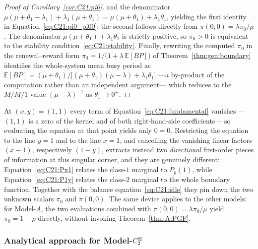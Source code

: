 \begin{proof}[Proof of Corollary~\ref{cor:C21:pi0}]
    and the denominator $\mu(\mu+\theta_1-\lambda_1)+\lambda_1(\mu+\theta_1)=\mu(\mu+\theta_1)+\lambda_1\theta_1$,
    yielding the first identity in Equation~\eqref{eq:C21:pi0_pi00}; the second follows directly from
    $\pi(0,0)=\lambda\pi_0/\mu$. The denominator $\mu(\mu+\theta_1)+\lambda_1\theta_1$ is strictly positive, so $\pi_0>0$ is equivalent to the stability condition~\eqref{eq:C21:stability}. Finally, rewriting the computed $\pi_0$ in the renewal--reward form $\pi_0=1/\bigl(1+\lambda\,\mathbb{E}[BP]\bigr)$ of Theorem~\ref{thm:gen:boundary} identifies the whole-system mean busy period as $\mathbb{E}[BP]=(\mu+\theta_1)/\bigl[(\mu+\theta_1)(\mu-\lambda)+\lambda_1\theta_1\bigr]$ ---a by-product of the computation rather than an independent argument--- which reduces to the $M/M/1$ value $(\mu-\lambda)^{-1}$ as $\theta_1\to0^+$.
\end{proof}

\begin{remark}\label{rem:C21:order}
At $(x,y)=(1,1)$ every term of Equation~\eqref{eq:C21:fundamental} vanishes ---$(1,1)$ is a zero of the kernel and of both right-hand-side coefficients--- so evaluating the equation at that point yields only $0=0$. Restricting the equation to the line $y=1$ and to the line $x=1$, and cancelling the vanishing linear factors $(x-1)$, respectively $(1-y)$, extracts instead two \emph{directional} first-order pieces of information at this singular corner, and they are genuinely different: Equation~\eqref{eq:C21:Px1} relates the class-$1$ marginal to $P_y(1)$, while Equation~\eqref{eq:C21:P1y} relates the class-$2$ marginal to the whole boundary function. Together with the balance equation~\eqref{eq:C21:idle} they pin down the two unknown scalars $\pi_0$ and $\pi(0,0)$. The same device applies to the other models: for Model-$A$, the two evaluations combined with $\pi(0,0)=\lambda\pi_0/\mu$ yield $\pi_0=1-\rho$ directly, without invoking Theorem~\ref{thm:A:PGF}.
\end{remark}

\subsubsection{Analytical approach for Model-\texorpdfstring{$C_2^{\mathrm{H}}$}{C2-H}}\label{sssec:C21:analytical}

